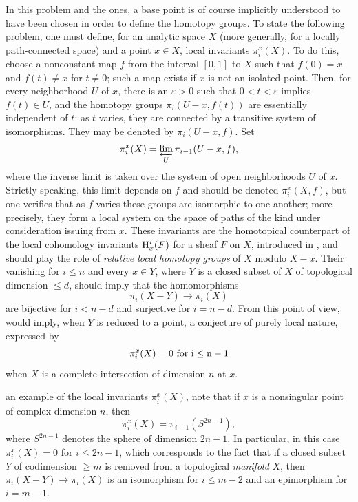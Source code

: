 In this problem and the  ones, a base point
is of course implicitly understood to have been chosen in order to
define the homotopy groups. To state the following problem, one must
define, for an analytic space $X$ (more generally, for a locally
path-connected space) and a point $x\in X$, local invariants\pageoriginale
$\pi_i^x(X)$.
\label{pagexpo} To do this, choose a nonconstant map
$f$ from the interval $[0,1]$ to $X$ such that $f(0)=x$ and $f(t)\neq x$
for $t\neq0$; such a map exists if $x$ is not an isolated point. Then,
for every neighborhood $U$ of $x$, there is an $\varepsilon>0$ such that
$0<t<\varepsilon$ implies $f(t)\in U$, and the homotopy groups
$\pi_i(U-x,f(t))$ are essentially independent of $t$: as $t$ varies,
they are connected by a transitive system of isomorphisms. They may be
denoted by $\pi_i(U-x,f)$. Set\label{pip15}\label{pXIII.15}
$$
\pi_i^x(X)=\varprojlim_U\pi_{i-1}(U-x,f),
$$
where the inverse limit is taken over the system of open neighborhoods
$U$ of $x$. Strictly speaking, this limit depends on $f$ and should be
denoted $\pi_i^x(X,f)$, but one verifies that as $f$ varies these groups
are isomorphic to one another;
more precisely, they form a local system on the space of paths of the
kind under consideration issuing from $x$. These invariants are the
homotopical counterpart of the local cohomology invariants $\mathrm H_x^i(F)$
for a sheaf $F$ on $X$, introduced in , and should play the role
of \emph{relative local homotopy groups} of $X$ modulo $X-x$. Their
vanishing for $i\leq n$ and every $x\in Y$, where $Y$ is a closed subset
of $X$ of topological dimension $\leq d$, should imply that the
homomorphisms
$$
\pi_i(X-Y)\to\pi_i(X)
$$
are bijective for $i<n-d$ and surjective for
$i=n-d$. From this point of view,
 would imply, when $Y$ is reduced to a point, a conjecture
of purely local nature, expressed by
$$
\pi_i^x(X)=0\ \rm{for}\ i\leq n-1\label{p15l}
$$
when $X$ is a complete intersection of dimension $n$ at $x$.

 an example of the local invariants $\pi_i^x(X)$, note that
if $x$ is a nonsingular point of  complex
dimension $n$, then\pageoriginale
$$
\pi_i^x(X)=\pi_{i-1}(S^{2n-1}),
$$
where $S^{2n-1}$ denotes the sphere of dimension $2n-1$. In particular,
in this case $\pi_i^x(X)=0$ for $i\leq2n-1$, which corresponds to the
fact that if a closed subset $Y$ of codimension $\geq m$ is removed from
a topological \emph{manifold} $X$, then
$\pi_i(X-Y)\to\pi_i(X)$ is an isomorphism for $i\leq m-2$ and an
epimorphism for $i=m-1$.

